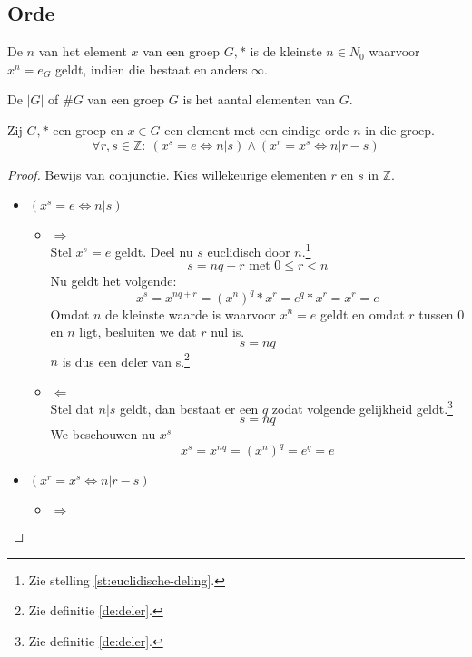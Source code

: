 \documentclass[main.tex]{subfiles}
\begin{document}
\subsection{Orde}
\label{sec:orde}

\begin{de}
  De  $n$ van het element $x$ van een groep $G,*$ is de kleinste $n \in N_{0}$ waarvoor $x^{n} = e_{G}$ geldt, indien die bestaat en anders $\infty$.
\end{de}

\begin{de}
  De  $|G|$ of $\#G$ van een groep $G$ is het aantal elementen van $G$.
\end{de}

\begin{ei}
  \label{ei:groep-eindige-orde-deelbaarheid}
  Zij $G,*$ een groep en $x \in G$ een element met een eindige orde $n$ in die groep.
  \[ \forall r,s \in \mathbb{Z}:\ (x^{s} = e \Leftrightarrow n | s) \wedge (x^{r} = x^{s} \Leftrightarrow n | r-s)\]
  \begin{proof}
    Bewijs van conjunctie.
    Kies willekeurige elementen $r$ en $s$ in $\mathbb{Z}$.
    \begin{itemize}
    \item $(x^{s} = e \Leftrightarrow n | s)$
      \begin{itemize}
      \item $\Rightarrow$\\
        Stel $x^{s} = e$ geldt.
        Deel nu $s$ euclidisch door $n$.\footnote{Zie stelling \ref{st:euclidische-deling}.}
        \[ s = nq + r \text{ met } 0 \le r < n \]
        Nu geldt het volgende:
        \[ x^{s} = x^{nq + r} = (x^{n})^{q} * x^{r} = e^{q} * x^{r} = x^{r} = e\]
        Omdat $n$ de kleinste waarde is waarvoor $x^{n}=e$ geldt en omdat $r$ tussen $0$ en $n$ ligt, besluiten we dat $r$ nul is.
        \[ s = nq \]
        $n$ is dus een deler van s.\footnote{Zie definitie \ref{de:deler}.}
      \item $\Leftarrow$\\
        Stel dat $n | s$ geldt, dan bestaat er een $q$ zodat volgende gelijkheid geldt.\footnote{Zie definitie \ref{de:deler}.}
        \[ s = nq \]
        We beschouwen nu $x^{s}$
        \[ x^{s} = x^{nq} = (x^{n})^{q} = e^{q} = e\]
      \end{itemize}
    \item $(x^{r} = x^{s} \Leftrightarrow n | r-s)$
      \begin{itemize}
      \item $\Rightarrow$\\

\end{itemize}
\end{itemize}
\end{proof}
\end{ei}
\end{document}
